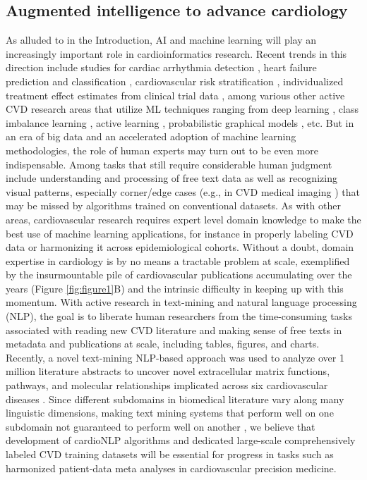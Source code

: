 \documentclass[letter]{bioinfo}
\begin{document}
	\subsection*{Augmented intelligence to advance cardiology}
	As alluded to in the Introduction, AI and machine learning will play an increasingly important role in cardioinformatics research.  Recent trends in this direction include studies for cardiac arrhythmia detection \citep{Hannun:2019:Cardiologist}, heart failure prediction and classification \citep{Awan:2018:Machine,Choi:2017:Using,Shah:2015:phenomapping}, cardiovascular risk stratification \citep{Singh:2011:Acomparison}, individualized treatment effect estimates from clinical trial data \citep{Duan:2019:Clinical}, among various other active CVD research areas \citep{Johnson:2018:Artificial,Alaref:2018:Clinical,Krittanawong:2017:Artificial} that utilize ML techniques ranging from deep learning \citep{Hannun:2019:Cardiologist,Bizopoulos:2018:Deep,Madani:2018:Deep,Lee:2018:Deep,Kwon:2018:Algorithm,Choi:2017:Using}, class imbalance learning \citep{Liu:2014:Risk,Rahman2013AddressingTC}, active learning \citep{NIPS2010_4091}, probabilistic graphical models \citep{Orphanou:2016:DBN,Gong:2015:Inferring}, etc.  But in an era of big data and an accelerated adoption of machine learning methodologies, the role of human experts may turn out to be even more indispensable. Among tasks that still require considerable human judgment include understanding and processing of free text data as well as recognizing visual patterns, especially corner/edge cases (e.g., in CVD medical imaging \citep{Slomka:2017:Cardiac,Fonseca:2011:Cardiac}) that may be missed by algorithms trained on conventional datasets.  As with other areas, cardiovascular research requires expert level domain knowledge to make the best use of machine learning applications, for instance in properly labeling CVD data or harmonizing it across epidemiological cohorts.  Without a doubt, domain expertise in cardiology is by no means a tractable problem at scale, exemplified by the insurmountable pile of cardiovascular publications accumulating over the years (Figure \ref{fig:figure1}B) and the intrinsic difficulty in keeping up with this momentum.  With active research in text-mining and natural language processing (NLP), the goal is to liberate human researchers from the time-consuming tasks associated with reading new CVD literature and making sense of free texts in metadata and publications at scale, including tables, figures, and charts.  Recently, a novel text-mining NLP-based approach was used to analyze over 1 million literature abstracts to uncover novel extracellular matrix functions, pathways, and molecular relationships implicated across six cardiovascular diseases \citep{Liem:2018:phrase}.  Since different subdomains in biomedical literature vary along many linguistic dimensions, making text mining systems that perform well on one subdomain not guaranteed to perform well on another \citep{Lippincott:2011:Exploring, Kilicoglu:2018:Biomedical, Khomtchouk:2018:Biochat}, we believe that development of cardioNLP algorithms and dedicated large-scale comprehensively labeled CVD training datasets will be essential for progress in tasks such as harmonized patient-data meta analyses in cardiovascular precision medicine.  
	
\end{document}
